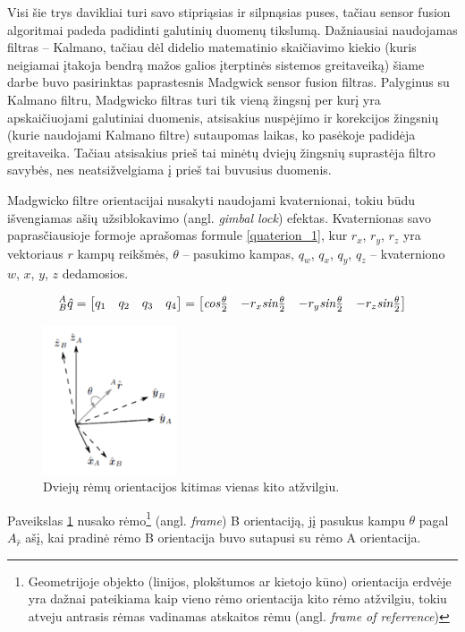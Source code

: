 \documentclass[]{vgtuef}
\begin{document}
Visi šie trys davikliai turi savo stipriąsias ir silpnąsias puses, tačiau sensor fusion algoritmai padeda padidinti galutinių duomenų tikslumą. Dažniausiai naudojamas filtras – Kalmano, tačiau dėl didelio matematinio skaičiavimo kiekio (kuris neigiamai įtakoja bendrą mažos galios įterptinės sistemos greitaveiką) šiame darbe buvo pasirinktas paprastesnis Madgwick sensor fusion filtras. Palyginus su Kalmano filtru, Madgwicko filtras turi tik vieną žingsnį per kurį yra apskaičiuojami galutiniai duomenis, atsisakius nuspėjimo ir korekcijos žingsnių (kurie naudojami Kalmano filtre) sutaupomas laikas, ko pasėkoje padidėja greitaveika. Tačiau atsisakius prieš tai minėtų dviejų žingsnių suprastėja filtro savybės, nes neatsižvelgiama į prieš tai buvusius duomenis.

Madgwicko filtre orientacijai nusakyti naudojami kvaternionai, tokiu būdu išvengiamas ašių užsiblokavimo (angl. \textit{gimbal lock}) efektas. Kvaternionas savo paprasčiausioje formoje aprašomas formule \ref{quaterion_1}, kur $r_{x}$, $r_{y}$, $r_{z}$ yra vektoriaus $r$ kampų reikšmės, $\theta$ – pasukimo kampas, $q_{w}$, $q_{x}$, $q_{y}$, $q_{z}$ – kvaterniono $w$, $x$, $y$, $z$ dedamosios. 

\begin{equation}
_{B}^{A}\hat{q}= \begin{bmatrix} q_{1} & q_{2} & q_{3} & q_{4}
\end{bmatrix} = \begin{bmatrix}
\emph{cos}\frac{\theta}{2} & -r_{x}\emph{sin}\frac{\theta}{2} & -r_{y}\emph{sin}\frac{\theta}{2} & -r_{z}\emph{sin}\frac{\theta}{2}
\end{bmatrix}
\label{quaterion_1}
\end{equation}

\begin{figure}[!h]
  \centering
  \includegraphics[width=150px]{img/quaternion_frame.png}
  \caption{Dviejų rėmų orientacijos kitimas vienas kito atžvilgiu.}
  \label{fig:quaternion_2}
\end{figure}

Paveikslas \ref{fig:quaternion_2} nusako rėmo\footnote{Geometrijoje objekto (linijos, plokštumos ar kietojo kūno) orientacija erdvėje yra dažnai pateikiama kaip vieno rėmo orientacija kito rėmo atžvilgiu, tokiu atveju antrasis rėmas vadinamas atskaitos rėmu (angl. \textit{frame of referrence})} (angl. \textit{frame}) B orientaciją, jį pasukus kampu $\theta$ pagal $A_{\hat{r}}$  ašį, kai pradinė rėmo B orientacija buvo sutapusi su rėmo A orientacija.
\end{document}
